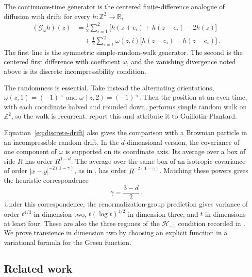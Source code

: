 \documentclass[11pt]{amsart}
\theoremstyle{plain}
\theoremstyle{definition}
\newcommand{\Z}{\mathbb Z}
\newcommand{\R}{\mathbb R}
\newcommand{\1}{\mathbf 1}
\newcommand{\abs}[1]{\lvert #1\rvert}
\newcommand{\Hs}{\mathcal H}
\begin{document}
The continuous-time generator is the centered finite-difference
analogue of diffusion with drift: for every $h\colon\Z^2\to\R$,
\begin{equation}\label{eq:discrete-drift}
\begin{split}
  (\mathcal G_\omega h)(z)
  &=\frac12\sum_{i=1}^2
    \bigl[h(z+e_i)+h(z-e_i)-2h(z)\bigr]\\
  &\quad+\frac12\sum_{i=1}^2\omega(z,i)
    \bigl[h(z+e_i)-h(z-e_i)\bigr]\, .
\end{split}
\end{equation}
The first line is the symmetric simple-random-walk generator.  The second is
the centered first difference with coefficient $\omega$, and the vanishing
divergence noted above is its discrete incompressibility condition.

The randomness is essential.  Take instead the alternating orientations,
$\omega(z,1)=(-1)^{z_2}$ and $\omega(z,2)=(-1)^{z_1}$.  Then the
position at an even time, with each coordinate halved and rounded down,
performs simple random walk on $\Z^2$, so the walk is recurrent.  \citet*[p.~2]{BH23} report
this and attribute it to Guillotin-Plantard.

Equation~\eqref{eq:discrete-drift} also gives the comparison with a Brownian
particle in an incompressible random drift.  In the $d$-dimensional version,
the covariance of one component of $\omega$ is supported on its coordinate
axis.  Its average over a box of side $R$ has order $R^{1-d}$.  The average
over the same box of an isotropic covariance of order
$\abs{x-y}^{-2(1-\gamma)}$, as in \citet*[(1.2)]{ABK26}, has order
$R^{-2(1-\gamma)}$.  Matching these powers gives the heuristic
correspondence
\begin{equation}\label{eq:gamma-dimension}
  \gamma=\frac{3-d}{2}\, .
\end{equation}
Under this correspondence, the renormalization-group prediction
\citep*[(1.3)]{ABK26} gives variance of order $t^{4/3}$ in dimension two,
$t(\log t)^{1/2}$ in dimension three, and $t$ in dimensions at least four.
These are also the three regimes of the $\Hs_{-1}$ condition recorded in
\citet*[Section~1.4]{Tot18}.  We prove transience in dimension two by choosing
an explicit function in a variational formula for the Green function.

\subsection{Related work}\label{ssec:related-work}
\end{document}
